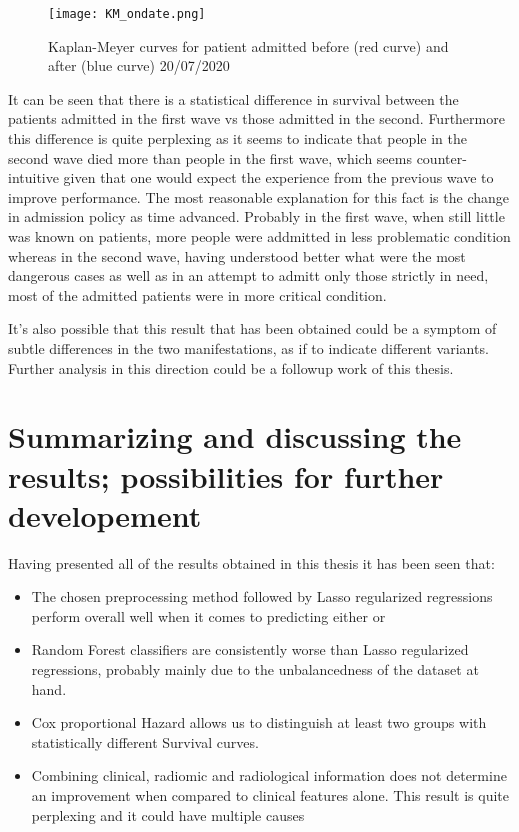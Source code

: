 \begin{figure}
\texttt{[image: KM\_ondate.png]}
\caption{Kaplan-Meyer curves for patient admitted before (red curve) and after (blue curve) 20/07/2020 \label{fig:kmwaves}}
\end{figure}

It can be seen that there is a statistical difference in survival between the patients admitted in the first wave vs those admitted in the second. 
Furthermore this difference is quite perplexing as it seems to indicate that people in the second wave died more than people in the first wave, which seems counter-intuitive given that one would expect the experience from the previous wave to improve performance.
The most reasonable explanation for this fact is the change in admission policy as time advanced.
Probably in the first wave, when still little was known on \covid patients, more people were addmitted in less problematic condition whereas in the second wave, having understood better what were the most dangerous cases as well as in an attempt to admitt only those  strictly in need, most of the admitted patients were in more critical condition.

It's also possible that this result that has been obtained could be a symptom of subtle differences in the two \covid manifestations, as if to indicate different variants.
Further analysis in this direction could be a followup work of this thesis.

\chapter{Summarizing and discussing the results; possibilities for further developement}
Having presented all of the results obtained in this thesis it has been seen that:

\begin{itemize}
\item The chosen preprocessing method followed by Lasso regularized regressions perform overall well when it comes to predicting either \death or \icu
\item Random Forest classifiers are consistently worse than Lasso regularized regressions, probably mainly due to the unbalancedness of the dataset at hand.
\item Cox proportional Hazard allows us to distinguish at least two groups with statistically different Survival curves.
\item Combining clinical, radiomic and radiological information does not determine an improvement when compared to clinical features alone.
This result is quite perplexing and it could have multiple causes
\end{itemize}

